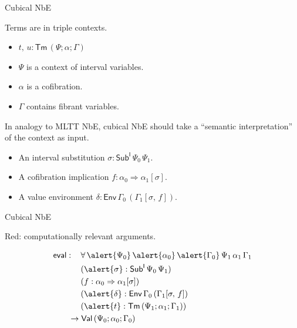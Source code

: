 \documentclass[dvipsnames]{beamer}
\newcommand{\ms}[1]{\mathsf{#1}}
\newcommand{\Sub}{\mathsf{Sub}}
\newcommand{\Tm}{\mathsf{Tm}}
\newcommand{\coe}{\mathsf{coe}}
\newcommand{\Env}{\ms{Env}}
\newcommand{\Val}{\ms{Val}}
\newcommand{\eval}{\ms{eval}}
\newcommand{\I}{\ms{I}}
\newcommand{\hcom}{\ms{hcom}}
\newcommand{\Glue}{\ms{Glue}}
\begin{document}
\begin{frame}{Cubical NbE}


Terms are in triple contexts.
\begin{itemize}
 \item $t,\,u : \Tm\,(\Psi;\alpha;\Gamma)$
 \item $\Psi$ is a context of interval variables.
 \item $\alpha$ is a cofibration.
 \item $\Gamma$ contains fibrant variables.
\end{itemize}
\vspace{1em}
\pause
In analogy to MLTT NbE, cubical NbE should take a ``semantic interpretation'' of
the context as input.
\begin{itemize}
 \item An interval substitution $\sigma : \Sub^\I\,\Psi_0\,\Psi_1$.
 \item A cofibration implication $f : \alpha_0 \Rightarrow \alpha_1[\sigma]$.
 \item A value environment $\delta : \Env\,\Gamma_0\,(\Gamma_1[\sigma,\,f])$.
\end{itemize}

\end{frame}

\begin{frame}{Cubical NbE}

\alert{Red:} computationally relevant arguments.

\begin{alignat*}{3}
  & \eval :\,&&\forall\,\alert{\Psi_0}\,\alert{\alpha_0}\,\alert{\Gamma_0}\,\Psi_1\,\alpha_1\,\Gamma_1\\
  &       && (\alert{\sigma} : \Sub^\I\,\Psi_0\,\Psi_1)\\
  &       && (f : \alpha_0 \Rightarrow \alpha_1[\sigma])\\
  &       && (\alert{\delta} : \Env\,\Gamma_0\,(\Gamma_1[\sigma,\,f])\\
  &       && (\alert{t} : \Tm\,(\Psi_1;\alpha_1;\Gamma_1))\\
  & &&\hspace{-1.5em} \to \Val\,(\Psi_0;\alpha_0;\Gamma_0)
\end{alignat*}

\end{frame}
\end{document}

